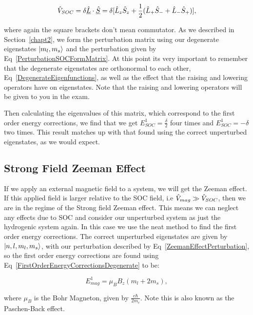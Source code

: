 \begin{equation}
    \Hat{V}_{SOC} = \delta \underline{\Hat{L}} \cdot \underline{\Hat{S}} = \delta [\Hat{L}_z \Hat{S}_z + \frac{1}{2}(\Hat{L}_+ \Hat{S}_- + \Hat{L}_- \Hat{S}_+)],
    \label{PerturbationSOCFormMatrix}
\end{equation}

\noindent where again the square brackets don't mean commutator. As we described in Section~\ref{chapt2}, we form the perturbation matrix using our degenerate eigenstates $\ket{m_l, m_s}$ and the perturbation given by Eq~\ref{PerturbationSOCFormMatrix}. At this point its very important to remember that the degenerate eigenstates are orthonormal to each other, Eq~\ref{DegenerateEigenfunctions}, as well as the effect that the raising and lowering operators have on eigenstates. Note that the raising and lowering operators will be given to you in the exam.

\noindent Then calculating the eigenvalues of this matrix, which correspond to the first order energy corrections, we find that we get $E^1_{SOC} = \frac{\delta}{2}$ four times and $E^1_{SOC} = -\delta$ two times. This result matches up with that found using the correct unperturbed eigenstates, as we would expect.

\subsection{Strong Field Zeeman Effect}

If we apply an external magnetic field to a system, we will get the Zeeman effect. If this applied field is larger relative to the SOC field, i.e $\Hat{V}_{mag} \gg \Hat{V}_{SOC}$, then we are in the regime of the Strong field Zeeman effect. This means we can neglect any effects due to SOC and consider our unperturbed system as just the hydrogenic system again. In this case we use the neat method to find the first order energy corrections. The correct unperturbed eigenstates are given by $\ket{n, l, m_l, m_s}$, with our perturbation described by Eq~\ref{ZeemanEffectPerturbation}, so  the first order energy corrections are found using Eq~\ref{FirstOrderEnergyCorrectionsDegenerate} to be:

\begin{equation}
    E^1_{mag} = \mu_B B_z (m_l + 2m_s),
    \label{ZeemanEffectEnergyCorrections}
\end{equation}

\noindent where $\mu_B$ is the Bohr Magneton, given by $\frac{e\hbar}{2m_e}$. Note this is also known as the Paschen-Back effect. 

